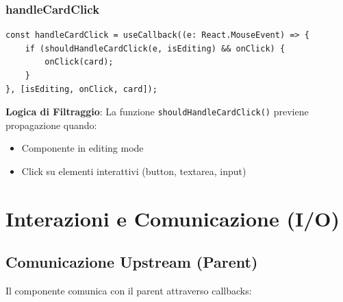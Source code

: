 \documentclass[11pt,a4paper]{article}
\begin{document}
\subsubsection{handleCardClick}

\begin{lstlisting}[style=typescript, caption=Handler Click Card]
const handleCardClick = useCallback((e: React.MouseEvent) => {
    if (shouldHandleCardClick(e, isEditing) && onClick) {
        onClick(card);
    }
}, [isEditing, onClick, card]);
\end{lstlisting}

\textbf{Logica di Filtraggio}:
La funzione \texttt{shouldHandleCardClick()} previene propagazione quando:
\begin{itemize}
    \item Componente in editing mode
    \item Click su elementi interattivi (button, textarea, input)
\end{itemize}


\section{Interazioni e Comunicazione (I/O)}

\subsection{Comunicazione Upstream (Parent)}

Il componente comunica con il parent attraverso callbacks:
\end{document}
